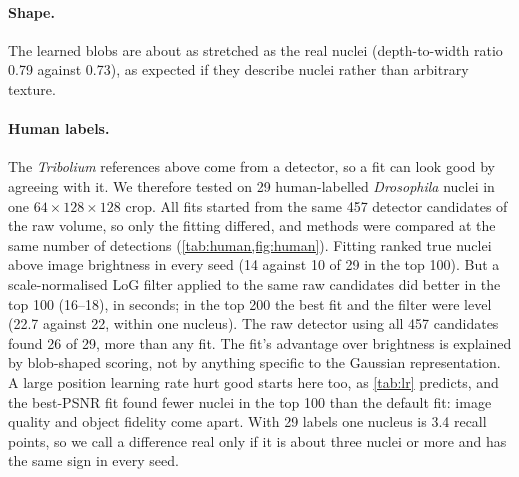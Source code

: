 \documentclass[
  paper=a4,
  fontsize=11pt,
  english,
  numbers=noenddot,
  parskip=half,
  cdgeometry=symmetric,
  cd=barcolor,
  cdfont=false
]{tudscrartcl}
\begin{document}
\paragraph{Shape.} The learned blobs are about as stretched as the real nuclei (depth-to-width
ratio 0.79 against 0.73), as expected if they describe nuclei rather than arbitrary texture.

\paragraph{Human labels.} The \emph{Tribolium} references above come from a detector, so a fit
can look good by agreeing with it. We therefore tested on 29 human-labelled \emph{Drosophila}
nuclei in one $64\times128\times128$ crop. All fits started from the same 457 detector
candidates of the raw volume, so only the fitting differed, and methods were compared at the
same number of detections (\cref{tab:human,fig:human}). Fitting ranked true nuclei above image
brightness in every seed (14 against 10 of 29 in the top 100). But a scale-normalised LoG filter
applied to the same raw candidates did better in the top 100 (16--18), in seconds; in the top
200 the best fit and the filter were level (22.7 against 22, within one nucleus). The raw
detector using all 457 candidates found 26 of 29, more than any fit. The fit's advantage over brightness is
explained by blob-shaped scoring, not by anything specific to the Gaussian representation. A
large position learning rate hurt good starts here too, as \cref{tab:lr} predicts, and the
best-PSNR fit found fewer nuclei in the top 100 than the default fit: image quality and object
fidelity come apart. With 29 labels one nucleus is 3.4 recall points, so we call a difference
real only if it is about three nuclei or more and has the same sign in every seed.
\end{document}
